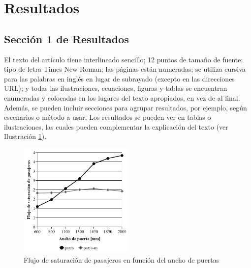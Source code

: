 \section{Resultados}
\label{sec:4}

\subsection{Sección 1 de Resultados}
\label{sec:4.1}

El texto del artículo tiene interlineado sencillo; 12 puntos de tamaño de fuente; tipo de letra Times New Roman; las páginas están numeradas; se utiliza cursiva para las palabras en inglés en lugar de subrayado (excepto en las direcciones URL); y todas las ilustraciones, ecuaciones, figuras y tablas se encuentran enumeradas y colocadas en los lugares del texto apropiados, en vez de al final.
Además, se pueden incluir secciones para agrupar resultados, por ejemplo, según escenarios o método a usar.
Los resultados se pueden ver en tablas o ilustraciones, las cuales pueden complementar la explicación del texto (ver Ilustración \ref{fig1}).

\begin{figure}[h]
    \centering
    \includegraphics[width=0.5\textwidth]{imagenes/fig1.png}
    \caption{Flujo de saturación de pasajeros en función del ancho de puertas}\label{fig1}
\end{figure}
